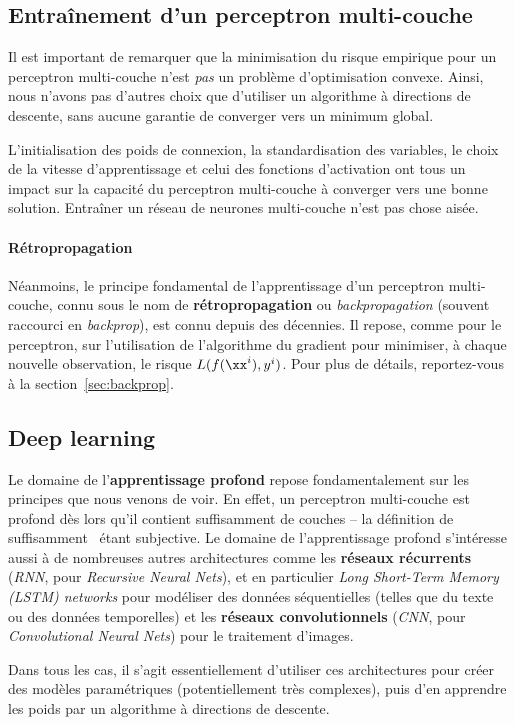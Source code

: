 \subsection{Entraînement d'un perceptron multi-couche}
Il est important de remarquer que la minimisation du risque empirique pour un
perceptron multi-couche n'est {\it pas} un problème d'optimisation
convexe. Ainsi, nous n'avons pas d'autres choix que d'utiliser un algorithme à
directions de descente, sans aucune garantie de converger vers un minimum
global.

L'initialisation des poids de connexion, la standardisation des variables, le
choix de la vitesse d'apprentissage et celui des fonctions d'activation ont
tous un impact sur la capacité du perceptron multi-couche à converger vers une
bonne solution. Entraîner un réseau de neurones multi-couche n'est pas chose
aisée.

\paragraph{Rétropropagation} Néanmoins, le principe fondamental de
l'apprentissage d'un perceptron multi-couche, connu sous le nom de
\textbf{rétropropagation} ou {\it backpropagation} (souvent raccourci en {\it
  backprop}), est connu depuis des décennies. Il repose, comme pour le
perceptron, sur l'utilisation de l'algorithme du
gradient pour minimiser, à chaque nouvelle observation, le risque
$L(f(\xx^i), y^i)$. Pour plus de détails, reportez-vous à la
section~\ref{sec:backprop}.
  
\subsection{Deep learning}
Le domaine de l'\textbf{apprentissage profond} repose
fondamentalement sur les principes que nous venons de voir. En effet, un
perceptron multi-couche est profond dès lors qu'il contient suffisamment de
couches -- la définition de \og suffisamment \fg~étant subjective.  Le
domaine de l'apprentissage profond s'intéresse aussi à de nombreuses autres
architectures comme les \textbf{réseaux récurrents} ({\it RNN}, pour {\it
  Recursive Neural Nets}), et en particulier {\it Long Short-Term Memory (LSTM)
  networks} pour modéliser des données séquentielles (telles que du texte ou
des données temporelles) et les \textbf{réseaux convolutionnels} ({\it CNN},
pour {\it Convolutional Neural Nets}) pour le traitement d'images.

Dans tous les cas, il s'agit essentiellement d'utiliser ces architectures pour
créer des modèles paramétriques (potentiellement très complexes), puis d'en
apprendre les poids par un algorithme à directions de descente.

